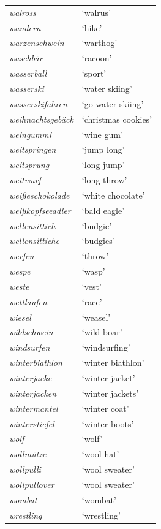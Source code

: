 \begin{longtable}{ll}
\textit{walross} & `walrus' \\
\textit{wandern} & `hike' \\
\textit{warzenschwein} & `warthog' \\
\textit{waschbär} & `racoon' \\
\textit{wasserball} & `sport' \\
\textit{wasserski} & `water skiing' \\
\textit{wasserskifahren} & `go water skiing' \\
\textit{weihnachtsgebäck} & `christmas cookies' \\
\textit{weingummi} & `wine gum' \\
\textit{weitspringen} & `jump long' \\
\textit{weitsprung} & `long jump' \\
\textit{weitwurf} & `long throw' \\
\textit{weißeschokolade} & `white chocolate' \\
\textit{weißkopfseeadler} & `bald eagle' \\
\textit{wellensittich} & `budgie' \\
\textit{wellensittiche} & `budgies' \\
\textit{werfen} & `throw' \\
\textit{wespe} & `wasp' \\
\textit{weste} & `vest' \\
\textit{wettlaufen} & `race' \\
\textit{wiesel} & `weasel' \\
\textit{wildschwein} & `wild boar' \\
\textit{windsurfen} & `windsurfing' \\
\textit{winterbiathlon} & `winter biathlon' \\
\textit{winterjacke} & `winter jacket' \\
\textit{winterjacken} & `winter jackets' \\
\textit{wintermantel} & `winter coat' \\
\textit{winterstiefel} & `winter boots' \\
\textit{wolf} & `wolf' \\
\textit{wollmütze} & `wool hat' \\
\textit{wollpulli} & `wool sweater' \\
\textit{wollpullover} & `wool sweater' \\
\textit{wombat} & `wombat' \\
\textit{wrestling} & `wrestling' \\

\end{longtable}
